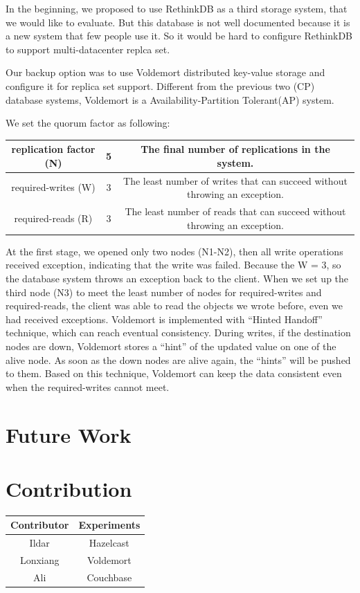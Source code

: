 \documentclass[a4paper]{article}
\begin{document}
In the beginning, we proposed to use RethinkDB as a third storage system, that we would like to evaluate. But this database is not well documented because it is a new system that few people use it. So it would be hard to configure RethinkDB to support multi-datacenter replca set.

Our backup option was to use Voldemort distributed key-value storage and configure it for replica set support. Different from the previous two (CP) database systems, Voldemort is a Availability-Partition Tolerant(AP) system. 

We set the quorum factor as following:

\begin{table}[hb]
  \centering
  \begin{tabular}{|c|c|c|}
    \hline
    replication factor (N) & 5 & The final number of replications in the system. \\
    \hline
    required-writes (W) & 3 & The least number of writes that can succeed without throwing an exception. \\
    \hline
    required-reads (R) & 3 & The least number of reads that can succeed without throwing an exception. \\
    \hline
  \end{tabular}
\end{table}

At the first stage, we opened only two nodes (N1-N2), then all write operations received exception, indicating that the write was failed. Because the W = 3, so the database system throws an exception back to the client. When we set up the third node (N3) to meet the least number of nodes for required-writes and required-reads, the client was able to read the objects we wrote before, even we had received exceptions. Voldemort is implemented with ``Hinted Handoff'' technique, which can reach eventual consistency. During writes, if the destination nodes are down, Voldemort stores a ``hint'' of the updated value on one of the alive node. As soon as the down nodes are alive again, the ``hints'' will be pushed to them. Based on this technique, Voldemort can keep the data consistent even when the required-writes cannot meet.



\section{Future Work}

\section*{Contribution}

\begin{table}[hb]
	\centering
	\begin{tabular}{|c|c|}
		\hline
		\rowcolor{light-gray} \textbf{Contributor} & \textbf{Experiments} \\ \hline
		Ildar & Hazelcast  \\ \hline
		Lonxiang & Voldemort  \\ \hline
		Ali & Couchbase  \\ \hline
	\end{tabular}
\end{table}
\end{document}
